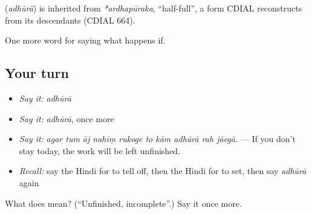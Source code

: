 \begin{cousinweb}
\textbf{} (\emph{adhūrā}) is inherited from \emph{*ardhapūraka}, \textquotedblleft{}half-full\textquotedblright{}, a form CDIAL reconstructs from its descendants (CDIAL 664).
\end{cousinweb}

\begin{grammarlens}[title={What you've built}]
One more word for saying what happens if.
\end{grammarlens}

\subsection*{Your turn}
\begin{itemize}
\raggedright
  \item \emph{Say it:} \emph{adhūrā}
  \item \emph{Say it:} \emph{adhūrā}, once more
  \item \emph{Say it:} \emph{agar tum āj nahīṃ rukoge to kām adhūrā rah jāegā.} — If you don't stay today, the work will be left unfinished.
  \item \emph{Recall:} say the Hindi for to tell off, then the Hindi for to set, then say \emph{adhūrā} again
\end{itemize}

\begin{tcolorbox}[breakable,colback=teal!4,colframe=teal!35!black,title={Before you move on}]
What does  mean? (\textquotedblleft{}Unfinished, incomplete\textquotedblright{}.) Say it once more.
\end{tcolorbox}

